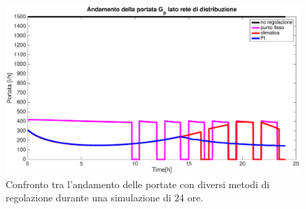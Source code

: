 \documentclass[laurea,oneside,11pt]{USiena_tesiLM}
\begin{document}
\begin{figure}[!ht]
\centering
\includegraphics[width=\textwidth]{figure/portate_confronto} 
\caption{Confronto tra l'andamento delle portate con diversi metodi di regolazione durante una simulazione di 24 ore.}
\label{fig:portate_confronto}
\end{figure}
\end{document}
